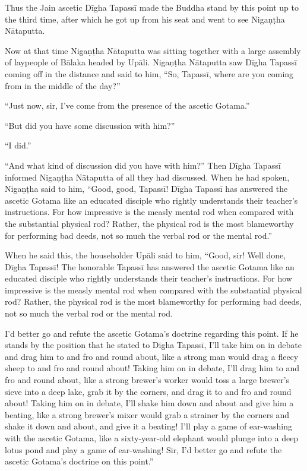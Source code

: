 \documentclass[12pt,openany]{book}%
\begin{document}
Thus the Jain ascetic \textsanskrit{Dīgha} \textsanskrit{Tapassī} made the Buddha stand by this point up to the third time, after which he got up from his seat and went to see \textsanskrit{Nigaṇṭha} \textsanskrit{Nātaputta}. 

Now at that time \textsanskrit{Nigaṇṭha} \textsanskrit{Nātaputta} was sitting together with a large assembly of laypeople of \textsanskrit{Bālaka} headed by \textsanskrit{Upāli}. \textsanskrit{Nigaṇṭha} \textsanskrit{Nātaputta} saw \textsanskrit{Dīgha} \textsanskrit{Tapassī} coming off in the distance and said to him, “So, \textsanskrit{Tapassī}, where are you coming from in the middle of the day?” 

“Just now, sir, I’ve come from the presence of the ascetic Gotama.” 

“But did you have some discussion with him?” 

“I did.” 

“And what kind of discussion did you have with him?” Then \textsanskrit{Dīgha} \textsanskrit{Tapassī} informed \textsanskrit{Nigaṇṭha} \textsanskrit{Nātaputta} of all they had discussed. When he had spoken, \textsanskrit{Nigaṇṭha} said to him, “Good, good, \textsanskrit{Tapassī}! \textsanskrit{Dīgha} \textsanskrit{Tapassī} has answered the ascetic Gotama like an educated disciple who rightly understands their teacher’s instructions. For how impressive is the measly mental rod when compared with the substantial physical rod? Rather, the physical rod is the most blameworthy for performing bad deeds, not so much the verbal rod or the mental rod.” 

When he said this, the householder \textsanskrit{Upāli} said to him, “Good, sir! Well done, \textsanskrit{Dīgha} \textsanskrit{Tapassī}! The honorable \textsanskrit{Tapassī} has answered the ascetic Gotama like an educated disciple who rightly understands their teacher’s instructions. For how impressive is the measly mental rod when compared with the substantial physical rod? Rather, the physical rod is the most blameworthy for performing bad deeds, not so much the verbal rod or the mental rod. 

I’d better go and refute the ascetic Gotama’s doctrine regarding this point. If he stands by the position that he stated to \textsanskrit{Dīgha} \textsanskrit{Tapassī}, I’ll take him on in debate and drag him to and fro and round about, like a strong man would drag a fleecy sheep to and fro and round about! Taking him on in debate, I’ll drag him to and fro and round about, like a strong brewer’s worker would toss a large brewer’s sieve into a deep lake, grab it by the corners, and drag it to and fro and round about! Taking him on in debate, I’ll shake him down and about and give him a beating, like a strong brewer’s mixer would grab a strainer by the corners and shake it down and about, and give it a beating! I’ll play a game of ear-washing with the ascetic Gotama, like a sixty-year-old elephant would plunge into a deep lotus pond and play a game of ear-washing! Sir, I’d better go and refute the ascetic Gotama’s doctrine on this point.” 
\end{document}
